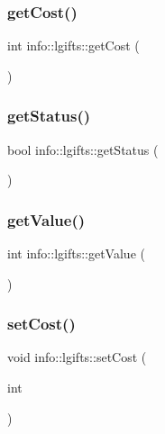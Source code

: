 \subsubsection{\texorpdfstring{get\+Cost()}{getCost()}}
{\footnotesize\ttfamily int info\+::lgifts\+::get\+Cost (\begin{DoxyParamCaption}{ }\end{DoxyParamCaption})}

\mbox{\label{classinfo_1_1lgifts_ae5547d121a6a1f3cddb0e4c317f247ec}} 
\subsubsection{\texorpdfstring{get\+Status()}{getStatus()}}
{\footnotesize\ttfamily bool info\+::lgifts\+::get\+Status (\begin{DoxyParamCaption}{ }\end{DoxyParamCaption})}

\mbox{\label{classinfo_1_1lgifts_aa3ba1bde30050bf30e7672e76142e617}} 
\subsubsection{\texorpdfstring{get\+Value()}{getValue()}}
{\footnotesize\ttfamily int info\+::lgifts\+::get\+Value (\begin{DoxyParamCaption}{ }\end{DoxyParamCaption})}

\mbox{\label{classinfo_1_1lgifts_a15086e5b37ba3be29007c34604ba8741}} 
\subsubsection{\texorpdfstring{set\+Cost()}{setCost()}}
{\footnotesize\ttfamily void info\+::lgifts\+::set\+Cost (\begin{DoxyParamCaption}\item[{int}]{ }\end{DoxyParamCaption})}

